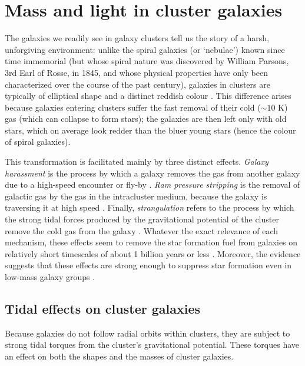 \section{Mass and light in cluster galaxies}

The galaxies we readily see in galaxy clusters tell us the story of a harsh, unforgiving environment: unlike the spiral galaxies (or `nebulae') known since time immemorial (but whose spiral nature was discovered by William Parsons, 3rd Earl of Rosse, in 1845, and whose physical properties have only been characterized over the course of the past century), galaxies in clusters are typically of elliptical shape and a distinct reddish colour \citep{dressler80,gladders00}. This difference arises because galaxies entering clusters suffer the fast removal of their cold ($\sim10$ K) gas (which can collapse to form stars); the galaxies are then left only with old stars, which on average look redder than the bluer young stars (hence the colour of spiral galaxies). 

This transformation is facilitated mainly by three distinct effects. \emph{Galaxy harassment} is the process by which a galaxy removes the gas from another galaxy due to a high-speed encounter or fly-by \citep{moore96}. \emph{Ram pressure stripping} is the removal of galactic gas by the gas in the intracluster medium, because the galaxy is traversing it at high speed \citep{gunn72,nulsen82}. Finally, \emph{strangulation} refers to the process by which the strong tidal forces produced by the gravitational potential of the cluster remove the cold gas from the galaxy \citep{larson80}. Whatever the exact relevance of each mechanism, these effects seem to remove the star formation fuel from galaxies on relatively short timescales of about 1 billion years or less \citep[e.g.][]{haines13,muzzin14}. Moreover, the evidence suggests that these effects are strong enough to suppress star formation even in low-mass galaxy groups \citep{haines15,balogh16}.


\subsection{Tidal effects on cluster galaxies}

Because galaxies do not follow radial orbits within clusters, they are subject to strong tidal torques from the cluster's gravitational potential. These torques have an effect on both the shapes and the masses of cluster galaxies.


